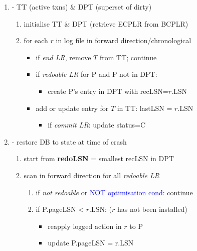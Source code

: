 \documentclass[10pt, landscape]{article}
\begin{document}
\begin{multicols*}{4}
  \begin{enumerate}
    \item {} - TT (active txns) \& DPT (superset of dirty)
          \begin{enumerate}
            \item initialise TT \& DPT (retrieve ECPLR from BCPLR)
            \item for each $r$ in log file in forward direction/chronological
                  \begin{itemize}
                    \item if \textit{end LR}, remove $T$ from TT; continue
                    \item if \textit{redoable LR} for P and P not in DPT:
                          \begin{itemize}
                            \item create P's entry in DPT with recLSN=$r$.LSN
                          \end{itemize}
                    \item add or update entry for $T$ in TT: lastLSN = $r$.LSN
                          \begin{itemize}
                            \item if \textit{commit LR}: update status=C
                          \end{itemize}
                  \end{itemize}
          \end{enumerate}
    \item {} - restore DB to state at time of crash
          \begin{enumerate}
            \item start from \textbf{redoLSN} = smallest recLSN in DPT
            \item scan in forward direction for all \textit{redoable LR}
                  \begin{enumerate}
                    \item if \textit{not redoable} or \textcolor{blue}{NOT optimisation cond}: continue
                    \item if P.pageLSN < $r$.LSN: ($r$ has not been installed)
                          \begin{itemize}
                            \item reapply logged action in $r$ to P
                            \item update P.pageLSN = r.LSN

\end{itemize}
\end{enumerate}
\end{enumerate}
\end{enumerate}
\end{multicols*}
\end{document}
